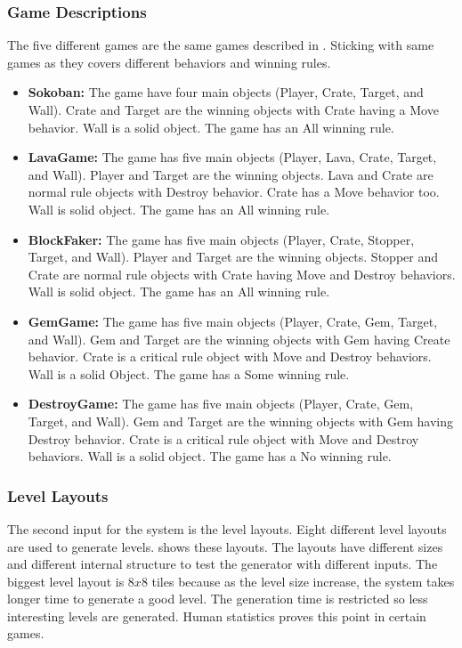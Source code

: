 \subsubsection{Game Descriptions}
The five different games are the same games described in . Sticking with same games as they covers different behaviors and winning rules.
\begin{itemize}
	\item \textbf{Sokoban:} The game have four main objects (Player, Crate, Target, and Wall). Crate and Target are the winning objects with Crate having a Move behavior. Wall is a solid object. The game has an All winning rule.
	
	\item \textbf{LavaGame:} The game has five main objects (Player, Lava, Crate, Target, and Wall). Player and Target are the winning objects. Lava and Crate are normal rule objects with Destroy behavior. Crate has a Move behavior too. Wall is solid object. The game has an All winning rule.
	
	\item \textbf{BlockFaker:} The game has five main objects (Player, Crate, Stopper, Target, and Wall). Player and Target are the winning objects. Stopper and Crate are normal rule objects with Crate having Move and Destroy behaviors. Wall is solid object. The game has an All winning rule.
	
	\item \textbf{GemGame:} The game has five main objects (Player, Crate, Gem, Target, and Wall). Gem and Target are the winning objects with Gem having Create behavior. Crate is a critical rule object with Move and Destroy behaviors. Wall is a solid Object. The game has a Some winning rule.
	
	\item \textbf{DestroyGame:} The game has five main objects (Player, Crate, Gem, Target, and Wall). Gem and Target are the winning objects with Gem having Destroy behavior. Crate is a critical rule object with Move and Destroy behaviors. Wall is a solid object. The game has a No winning rule.
\end{itemize}

\subsubsection{Level Layouts}
The second input for the system is the level layouts. Eight different level layouts are used to generate levels.  shows these layouts. The layouts have different sizes and different internal structure to test the generator with different inputs. The biggest level layout is $8x8$ tiles because as the level size increase, the system takes longer time to generate a good level. The generation time is restricted so less interesting levels are generated. Human statistics proves this point in certain games.

